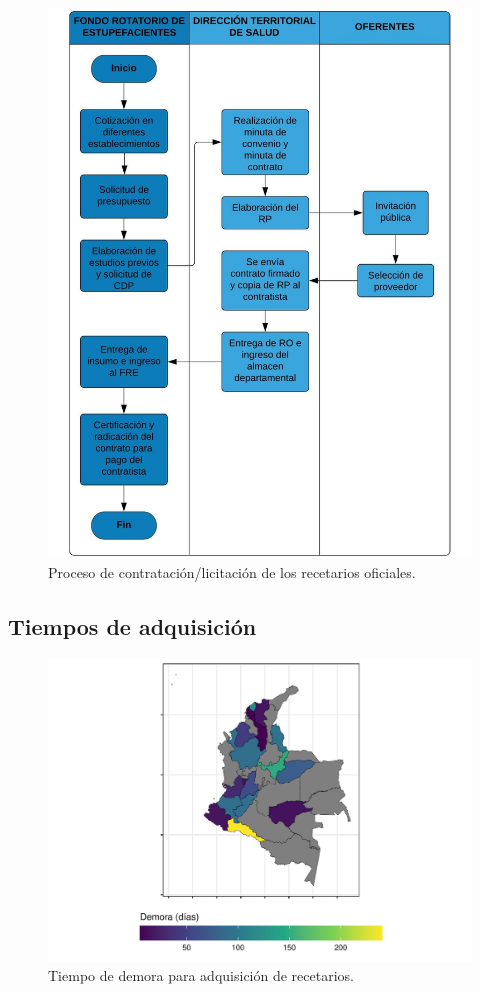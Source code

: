 \documentclass[
]{book}
\begin{document}
\begin{figure}

{\centering \includegraphics[width=0.8\linewidth]{figures/procesoContractual} 

}

\caption{Proceso de contratación/licitación de los recetarios oficiales.}\label{fig:procesoContractual}
\end{figure}

\hypertarget{tiempos-de-adquisiciuxf3n}{%
\subsection{Tiempos de adquisición}\label{tiempos-de-adquisiciuxf3n}}

\begin{figure}

{\centering \includegraphics[width=0.85\linewidth]{InformeFinal_files/figure-latex/tiempoDemoraAdquisicion-1} 

}

\caption{Tiempo de demora para adquisición de recetarios.}\label{fig:tiempoDemoraAdquisicion}
\end{figure}
\end{document}
